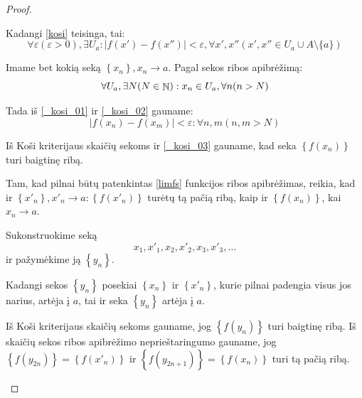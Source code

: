 \begin{prop}
\begin{proof}
\begin{description}
        Kadangi \ref{kosi} teisinga, tai:
        \begin{equation}
          \forall \varepsilon (\varepsilon > 0), \exists U_{a} :
          | f(x') - f(x'') | < \varepsilon, \forall x',x''
          (x',x'' \in U_{a} \cup A \setminus \{a\})
          \label{_kosi_01}
        \end{equation}

        Imame bet kokią seką $\left\{ x_{n} \right\}, x_{n} \to a$. Pagal
        sekos ribos apibrėžimą:
        \begin{equation}
          \forall U_{a}, \exists N (N \in \mathop{\mathbb{N}}) : 
            x_{n} \in U_{a}, \forall n (n > N)
          \label{_kosi_02}
        \end{equation}

        Tada iš \ref{_kosi_01} ir \ref{_kosi_02} gauname:
        \begin{equation}
          | f(x_{n}) - f(x_{m}) | < \varepsilon : \forall n, m (n,m > N)
          \label{_kosi_03}
        \end{equation}

        Iš Koši kriterijaus skaičių sekoms ir \ref{_kosi_03} gauname, kad
        seka $\left\{ f(x_{n}) \right\}$ turi baigtinę ribą.

        Tam, kad pilnai būtų patenkintas \ref{limfs} funkcijos ribos 
        apibrėžimas, reikia, kad ir 
        $\left\{ x'_{n} \right\}, x'_{n} \to a : \left\{ f(x'_{n}) \right\}$
        turėtų tą pačią ribą, kaip ir $\left\{ f(x_{n}) \right\}$, 
        kai $x_{n} \to a$.

        Sukonstruokime seką
        \begin{equation*}
          x_{1},x'_{1},x_{2},x'_{2},x_{3},x'_{3},\ldots
        \end{equation*}
        ir pažymėkime ją $\left\{ y_{n} \right\}$.

        Kadangi sekos $\left\{ y_{n} \right\}$ posekiai 
        $\left\{ x_{n} \right\}$ ir $\left\{ x'_{n} \right\}$, kurie pilnai 
        padengia visus jos narius, artėja į $a$, tai ir seka 
        $\left\{ y_{n} \right\}$ artėja į $a$.

        Iš Koši kriterijaus skaičių sekoms gauname, jog 
        $\left\{ f(y_{n}) \right\}$ turi baigtinę ribą. Iš skaičių sekos
        ribos apibrėžimo neprieštaringumo gauname, jog 
        $\left\{ f(y_{2n}) \right\} = \left\{ f(x'_{n}) \right\}$ ir
        $\left\{ f(y_{2n+1}) \right\} = \left\{ f(x_{n}) \right\}$ turi tą
        pačią ribą.

    \end{description}
  \end{proof}
\end{prop}

